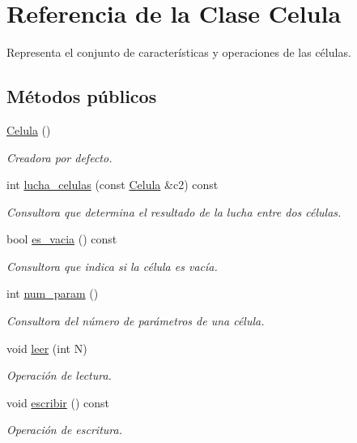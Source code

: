 \hypertarget{class_celula}{}\section{Referencia de la Clase Celula}
\label{class_celula}


Representa el conjunto de características y operaciones de las células.  


\subsection*{Métodos públicos}
\begin{DoxyCompactItemize}
\item 
\hyperlink{class_celula_a3c5017fbcec8cb564acc666aa7e21206}{Celula} ()
\begin{DoxyCompactList}\small\item\em Creadora por defecto. \end{DoxyCompactList}\item 
int \hyperlink{class_celula_a3dd8be98f1548b02696e2fc32b8d19b4}{lucha\+\_\+celulas} (const \hyperlink{class_celula}{Celula} \&c2) const 
\begin{DoxyCompactList}\small\item\em Consultora que determina el resultado de la lucha entre dos células. \end{DoxyCompactList}\item 
bool \hyperlink{class_celula_a4e97c60a207191b2cc951ccdf245df4b}{es\+\_\+vacia} () const 
\begin{DoxyCompactList}\small\item\em Consultora que indica si la célula es vacía. \end{DoxyCompactList}\item 
int \hyperlink{class_celula_a872a679a68e462dabde1ea4fe5fbc0ad}{num\+\_\+param} ()
\begin{DoxyCompactList}\small\item\em Consultora del número de parámetros de una célula. \end{DoxyCompactList}\item 
void \hyperlink{class_celula_a5124ea0c0da24dfc295dcc428652ee43}{leer} (int N)
\begin{DoxyCompactList}\small\item\em Operación de lectura. \end{DoxyCompactList}\item 
void \hyperlink{class_celula_ae16a94d28e49affafd260405414f37ad}{escribir} () const 
\begin{DoxyCompactList}\small\item\em Operación de escritura. \end{DoxyCompactList}\end{DoxyCompactItemize}
